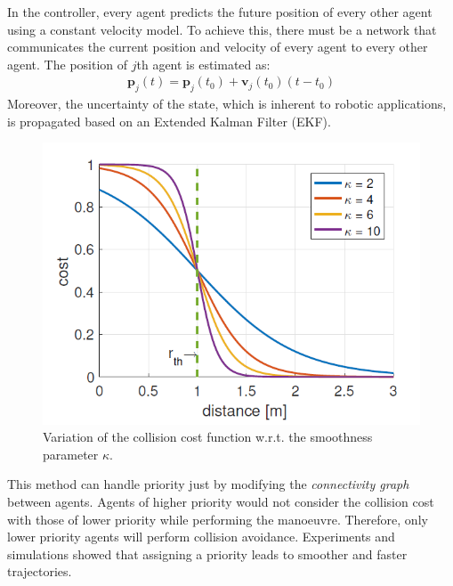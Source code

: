 In the controller, every agent predicts the future position of every other agent using a constant velocity model. To achieve this, there must be a network that communicates the current position and velocity of every agent to every other agent. The position of $j$th agent is estimated as:
\begin{align}
\textbf{p}_j(t) = \textbf{p}_j(t_0) + \textbf{v}_j(t_0)(t-t_0)
\end{align} 
Moreover, the uncertainty of the state, which is inherent to robotic applications, is propagated based on an Extended Kalman Filter (EKF).

\begin{figure}
\centering
\includegraphics[width=0.6\linewidth]{./images/cost_function_nmpc}
\caption[Collision cost function vs smoothness parameter]{Variation of the collision cost function w.r.t. the smoothness parameter $\kappa$. \cite{kamel2017robust}}
\end{figure}

This method can handle priority just by modifying the \textit{connectivity graph} between agents. Agents of higher priority would not consider the collision cost with those of lower priority while performing the manoeuvre. Therefore, only lower priority agents will perform collision avoidance. Experiments and simulations showed that assigning a priority leads to smoother and faster trajectories. 


